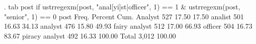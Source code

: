 {\smallskip}
. tab post if ustrregexm(post, "anal[yi]st|officer", 1) == 1 \& ustrregexm(post, "senior", 1) == 0
{\smallskip}
                        post {\VBAR}      Freq.     Percent        Cum.
                     Analyst {\VBAR}        527       17.50       17.50
                     analist {\VBAR}        501       16.63       34.13
                     analyst {\VBAR}        476       15.80       49.93
               fairy analyst {\VBAR}        512       17.00       66.93
                     officer {\VBAR}        504       16.73       83.67
              piracy analyst {\VBAR}        492       16.33      100.00
                       Total {\VBAR}      3,012      100.00
